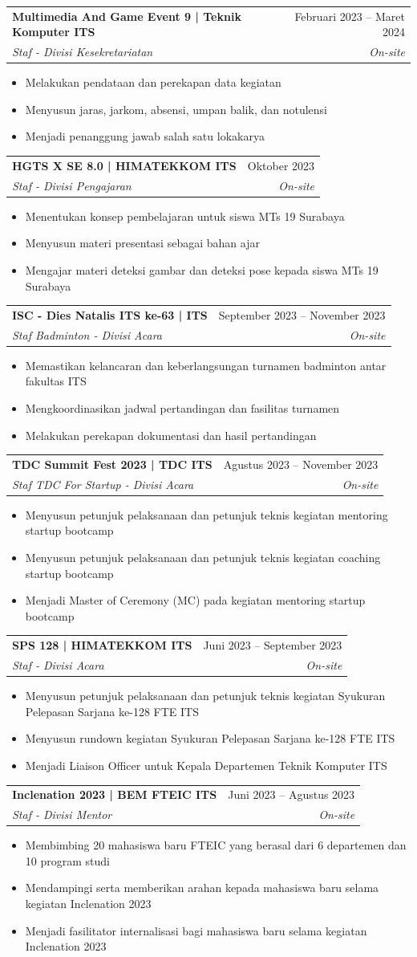 \documentclass[letterpaper,11pt]{article}
\makeatletter
\newcommand{\resumeItem}[1]{
	\item\small{
		{#1 \vspace{-2pt}}
	}
}
\newcommand{\resumeSubheading}[4]{
	\vspace{-2pt}\item
	\begin{tabular*}{0.97\textwidth}[t]{l@{\extracolsep{\fill}}r}
		\textbf{#1} & #2 \\
		\textit{\small#3} & \textit{\small #4} \\
	\end{tabular*}\vspace{-7pt}
}
\newcommand{\resumeItemListStart}{\begin{itemize}}
\newcommand{\resumeItemListEnd}{\end{itemize}\vspace{-5pt}}
\makeatother
\begin{document}
	\resumeSubheading
	{Multimedia And Game Event 9 | Teknik Komputer ITS}
	{Februari 2023 – Maret 2024}
	{Staf - Divisi Kesekretariatan}{On-site}
	\resumeItemListStart
	\resumeItem{Melakukan pendataan dan perekapan data kegiatan}
	\resumeItem{Menyusun jaras, jarkom, absensi, umpan balik, dan notulensi}
	\resumeItem{Menjadi penanggung jawab salah satu lokakarya}
	\resumeItemListEnd
	
	\resumeSubheading
	{HGTS X SE 8.0 | HIMATEKKOM ITS}
	{Oktober 2023}
	{Staf - Divisi Pengajaran}{On-site}
	\resumeItemListStart
	\resumeItem{Menentukan konsep pembelajaran untuk siswa MTs 19 Surabaya}
	\resumeItem{Menyusun materi presentasi sebagai bahan ajar}
	\resumeItem{Mengajar materi deteksi gambar dan deteksi pose kepada siswa MTs 19 Surabaya}
	\resumeItemListEnd
	
	\resumeSubheading
	{ISC - Dies Natalis ITS ke-63 | ITS}
	{September 2023 – November 2023}
	{Staf Badminton - Divisi Acara}{On-site}
	\resumeItemListStart
	\resumeItem{Memastikan kelancaran dan keberlangsungan turnamen badminton antar fakultas ITS}
	\resumeItem{Mengkoordinasikan jadwal pertandingan dan fasilitas turnamen}
	\resumeItem{Melakukan perekapan dokumentasi dan hasil pertandingan}
	\resumeItemListEnd
	
	\resumeSubheading
	{TDC Summit Fest 2023 | TDC ITS}
	{Agustus 2023 – November 2023}
	{Staf TDC For Startup - Divisi Acara}{On-site}
	\resumeItemListStart
	\resumeItem{Menyusun petunjuk pelaksanaan dan petunjuk teknis kegiatan mentoring startup bootcamp}
	\resumeItem{Menyusun petunjuk pelaksanaan dan petunjuk teknis kegiatan coaching startup bootcamp}
	\resumeItem{Menjadi Master of Ceremony (MC) pada kegiatan mentoring startup bootcamp}
	\resumeItemListEnd
	
	\resumeSubheading
	{SPS 128 | HIMATEKKOM ITS}
	{Juni 2023 – September 2023}
	{Staf - Divisi Acara}{On-site}
	\resumeItemListStart
	\resumeItem{Menyusun petunjuk pelaksanaan dan petunjuk teknis kegiatan Syukuran Pelepasan Sarjana ke-128 FTE ITS}
	\resumeItem{Menyusun rundown kegiatan Syukuran Pelepasan Sarjana ke-128 FTE ITS}
	\resumeItem{Menjadi Liaison Officer untuk Kepala Departemen Teknik Komputer ITS}
	\resumeItemListEnd
	
	\resumeSubheading
	{Inclenation 2023 | BEM FTEIC ITS}
	{Juni 2023 – Agustus 2023}
	{Staf - Divisi Mentor}{On-site}
	\resumeItemListStart
	\resumeItem{Membimbing 20 mahasiswa baru FTEIC yang berasal dari 6 departemen dan 10 program studi}
	\resumeItem{Mendampingi serta memberikan arahan kepada mahasiswa baru selama kegiatan Inclenation 2023}
	\resumeItem{Menjadi fasilitator internalisasi bagi mahasiswa baru selama kegiatan Inclenation 2023}
	\resumeItemListEnd
	
\end{document}
